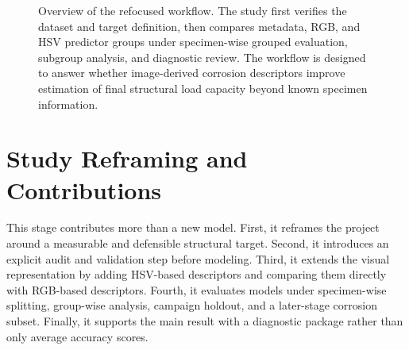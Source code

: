 \documentclass[conference]{IEEEtran}
\begin{document}
\begin{figure}[t]
    \centering
    \caption{Overview of the refocused workflow. The study first verifies the dataset and target definition, then compares metadata, RGB, and HSV predictor groups under specimen-wise grouped evaluation, subgroup analysis, and diagnostic review. The workflow is designed to answer whether image-derived corrosion descriptors improve estimation of final structural load capacity beyond known specimen information.}
    \label{fig:workflow}
\end{figure}

\section{Study Reframing and Contributions}
This stage contributes more than a new model. First, it reframes the project around a measurable and defensible structural target. Second, it introduces an explicit audit and validation step before modeling. Third, it extends the visual representation by adding HSV-based descriptors and comparing them directly with RGB-based descriptors. Fourth, it evaluates models under specimen-wise splitting, group-wise analysis, campaign holdout, and a later-stage corrosion subset. Finally, it supports the main result with a diagnostic package rather than only average accuracy scores.
\end{document}
